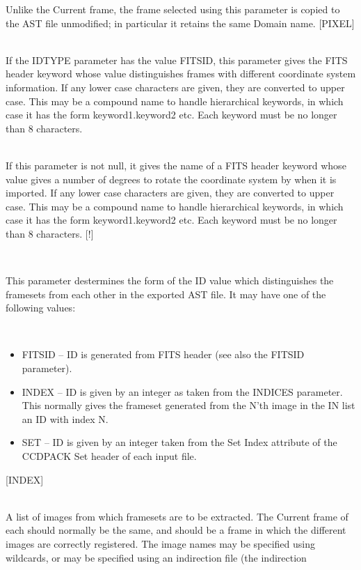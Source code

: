 \documentclass[twoside,11pt]{article}
\renewcommand{\_}{\texttt{\symbol{95}}}
\newcommand{\sstsubsection}[1]{ \item[{#1}] \mbox{} \\}
\newcommand{\sstitemlist}[1]{
  \mbox{} \\
  \vspace{-3.5ex}
  \begin{itemize}
     #1
  \end{itemize}
}
\newcommand{\sstitem}{\item}
\newcommand{\sstsubsection}[1]{\item[{#1}]}
\newcommand{\sstitemlist}[1]{
      \begin{itemize}
         #1
      \end{itemize}
      \\
   }
\newcommand{\sstitem}{\item}
\begin{document}
{{{         Unlike the Current frame, the frame selected using this
         parameter is copied to the AST file unmodified; in particular
         it retains the same Domain name.
         [PIXEL]
      }
      \sstsubsection{
         FITSID = LITERAL (Read)
      }{
         If the IDTYPE parameter has the value FITSID, this parameter
         gives the FITS header keyword whose value distinguishes
         frames with different coordinate system information.
         If any lower case characters are given, they are converted
         to upper case.  This may be a compound name to handle
         hierarchical keywords, in which case it has the form
         keyword1.keyword2 etc.  Each keyword must be no longer than
         8 characters.
      }
      \sstsubsection{
         FITSROT = LITERAL (Read)
      }{
         If this parameter is not null, it gives the name of a FITS
         header keyword whose value gives a number of degrees to
         rotate the coordinate system by when it is imported.
         If any lower case characters are given, they are converted
         to upper case.  This may be a compound name to handle
         hierarchical keywords, in which case it has the form
         keyword1.keyword2 etc.  Each keyword must be no longer than
         8 characters.
         [!]
      }
      \sstsubsection{
         IDTYPE = LITERAL (Read)
      } {
         This parameter destermines the form of the ID value which
         distinguishes the framesets from each other in the exported
         AST file.  It may have one of the following values:
         \sstitemlist{
            \sstitem
              FITSID  -- ID is generated from FITS header (see also
                    the FITSID parameter).
            \sstitem
              INDEX   -- ID is given by an integer as taken from the
                    INDICES parameter.  This normally gives the
                    frameset generated from the N'th image in the
                    IN list an ID with index N.
            \sstitem
              SET     -- ID is given by an integer taken from the 
                    Set Index attribute of the CCDPACK Set header
                    of each input file.
         }
         [INDEX]
      }
      \sstsubsection{
          IN = LITERAL (Read)
      } {
          A list of images from which framesets are to be extracted.
          The Current frame of each should normally be the same, and
          should be a frame in which the different images are correctly
          registered.  The image names may be specified using wildcards,
          or may be specified using an indirection file (the indirection
}}}
\end{document}
